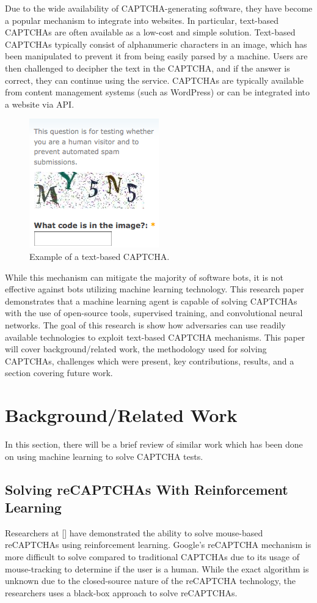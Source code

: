 \documentclass[11pt,conference]{IEEEtran}
\begin{document}
Due to the wide availability of CAPTCHA-generating software, they have become a popular
mechanism to integrate into websites. In particular, text-based CAPTCHAs are
often available as a low-cost and simple solution. Text-based CAPTCHAs
typically consist of alphanumeric characters in an image, which has been
manipulated to prevent it from being easily parsed by a machine. Users are then
challenged to decipher the text in the CAPTCHA, and if the answer is correct,
they can continue using the service. CAPTCHAs are typically available from
content management systems (such as WordPress) or can be integrated into a
website via API.

\begin{figure}[htbp]
	\centerline{\includegraphics[scale=0.7]{images/alphanumeric-captcha.png}}
	\caption{Example of a text-based CAPTCHA.}
	\label{figure}
\end{figure}

While this mechanism can mitigate the majority of software bots, it is not
effective against bots utilizing machine learning technology. This research
paper demonstrates that a machine learning agent is capable of solving CAPTCHAs
with the use of open-source tools, supervised training, and convolutional
neural networks. The goal of this research is show how adversaries can use
readily available technologies to exploit text-based CAPTCHA mechanisms.
This paper will cover background/related work, the methodology  used for solving CAPTCHAs,
challenges which were present, key contributions, results, and a section
covering future work.

\section{Background/Related Work}
In this section, there will be a brief review of similar work which has been
done on using machine learning to solve CAPTCHA tests.

\subsection{Solving reCAPTCHAs With Reinforcement Learning}
Researchers at [] have demonstrated the ability to solve mouse-based reCAPTCHAs using
reinforcement learning. Google's reCAPTCHA mechanism is more difficult to solve
compared to traditional CAPTCHAs due to its usage of mouse-tracking to
determine if the user is a human. While the exact algorithm is unknown due to
the closed-source nature of the reCAPTCHA technology, the researchers uses a
black-box approach to solve reCAPTCHAs.
\end{document}
